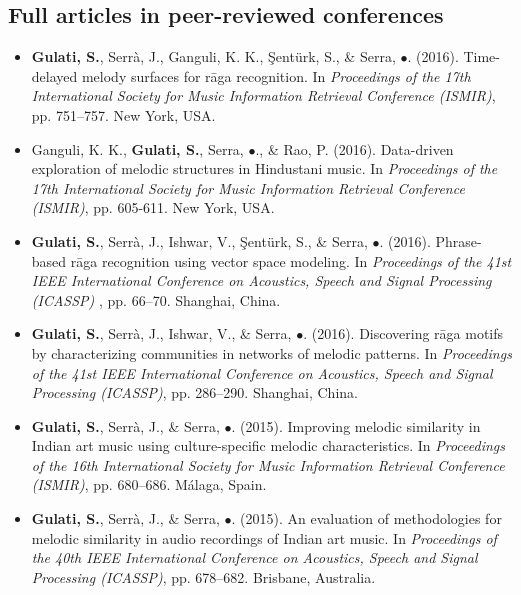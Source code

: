 \subsection*{Full articles in peer-reviewed conferences}
\begin{itemize}[leftmargin=*]
	\item \textbf{Gulati, S.}, Serr{\`a}, J., Ganguli, K. K., \c{S}ent{\"u}rk, S., \& Serra, $\bullet$. (2016). Time-delayed melody surfaces for r\={a}ga recognition. In \textit{Proceedings of the 17th International Society for Music Information Retrieval Conference (ISMIR)}, pp. 751–757. New York, USA.
	\item Ganguli, K. K., \textbf{Gulati, S.}, Serra, $\bullet$., \& Rao, P. (2016). Data-driven exploration of melodic structures in Hindustani music. In \textit{Proceedings of the 17th International Society for Music Information Retrieval Conference (ISMIR)}, pp. 605-611. New York, USA.
	\item \textbf{Gulati, S.}, Serr{\`a}, J., Ishwar, V., \c{S}ent{\"u}rk, S., \& Serra, $\bullet$. (2016). Phrase-based r\={a}ga recognition using vector space modeling. In \textit{Proceedings of the 41st IEEE International Conference on Acoustics, Speech and Signal Processing (ICASSP)} , pp. 66–70. Shanghai, China.
	\item \textbf{Gulati, S.}, Serr{\`a}, J., Ishwar, V., \& Serra, $\bullet$. (2016). Discovering r\={a}ga motifs by characterizing communities in networks of melodic patterns. In \textit{Proceedings of the 41st IEEE International Conference on Acoustics, Speech and Signal Processing (ICASSP)}, pp. 286–290. Shanghai, China.
	\item \textbf{Gulati, S.}, Serr{\`a}, J., \& Serra, $\bullet$. (2015). Improving melodic similarity in Indian art music using culture-specific melodic characteristics. In \textit{Proceedings of the 16th International Society for Music Information Retrieval Conference (ISMIR)}, pp. 680–686. M{\'a}laga, Spain.
	\item \textbf{Gulati, S.}, Serr{\`a}, J., \& Serra, $\bullet$. (2015). An evaluation of methodologies for melodic similarity in audio recordings of Indian art music. In \textit{Proceedings of the 40th IEEE International Conference on Acoustics, Speech and Signal Processing (ICASSP)}, pp. 678–682. Brisbane, Australia.

\end{itemize}
